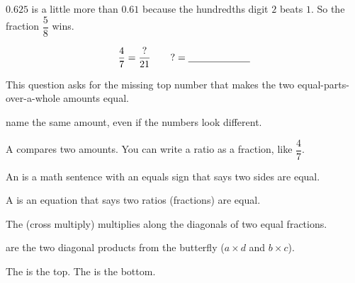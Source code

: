 
\noindent $0.625$ is a little more than $0.61$ because the hundredths digit $2$
beats $1$. So the fraction $\dfrac{5}{8}$ wins.


\[ \frac{4}{7} = \frac{?}{21} \qquad {?} = \underline{\hspace{2.2cm}} \]


\noindent This question asks for the missing top number that makes the two
equal-parts-over-a-whole amounts equal.

\begin{words}
  \item {}name the same amount, even if the numbers look different.
  \item A compares two amounts. You can write a ratio as a fraction,
        like $\dfrac{4}{7}$.
  \item An is a math sentence with an equals sign that says two sides
        are equal.
  \item A is an equation that says two ratios (fractions) are equal.
  \item The (cross multiply) multiplies along the diagonals of
        two equal fractions.
  \item {}are the two diagonal products from the butterfly
        ($a \times d$ and $b \times c$).
  \item The is the top. The is the bottom.
\end{words}

